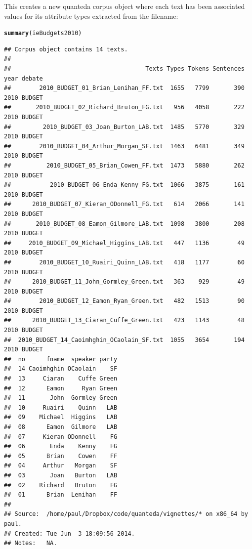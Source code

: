 \documentclass[11pt]{article}\usepackage[]{graphicx}\usepackage[]{color}
\makeatletter
\newcommand{\hlstd}[1]{\textcolor[rgb]{0.345,0.345,0.345}{#1}}%
\newcommand{\hlkwd}[1]{\textcolor[rgb]{0.737,0.353,0.396}{\textbf{#1}}}%
\newenvironment{kframe}{%
 \def\at@end@of@kframe{}%
 \ifinner\ifhmode%
  \def\at@end@of@kframe{\end{minipage}}%
  \begin{minipage}{\columnwidth}%
 \fi\fi%
 \def\FrameCommand##1{\hskip\@totalleftmargin \hskip-\fboxsep
 \colorbox{shadecolor}{##1}\hskip-\fboxsep
     \hskip-\linewidth \hskip-\@totalleftmargin \hskip\columnwidth}%
 \MakeFramed {\advance\hsize-\width
   \@totalleftmargin\z@ \linewidth\hsize
   \@setminipage}}%
 {\par\unskip\endMakeFramed%
 \at@end@of@kframe}
\newenvironment{knitrout}{}{} %
\makeatother
\begin{document}
This creates a new quanteda corpus object where each text has been associated values for its attribute types extracted from the filename:

\begin{knitrout}
\color{fgcolor}\begin{kframe}
\begin{alltt}
\hlkwd{summary}\hlstd{(ieBudgets2010)}
\end{alltt}
\begin{verbatim}
## Corpus object contains 14 texts.
## 
##                                      Texts Types Tokens Sentences year debate
##        2010_BUDGET_01_Brian_Lenihan_FF.txt  1655   7799       390 2010 BUDGET
##       2010_BUDGET_02_Richard_Bruton_FG.txt   956   4058       222 2010 BUDGET
##         2010_BUDGET_03_Joan_Burton_LAB.txt  1485   5770       329 2010 BUDGET
##        2010_BUDGET_04_Arthur_Morgan_SF.txt  1463   6481       349 2010 BUDGET
##          2010_BUDGET_05_Brian_Cowen_FF.txt  1473   5880       262 2010 BUDGET
##           2010_BUDGET_06_Enda_Kenny_FG.txt  1066   3875       161 2010 BUDGET
##      2010_BUDGET_07_Kieran_ODonnell_FG.txt   614   2066       141 2010 BUDGET
##       2010_BUDGET_08_Eamon_Gilmore_LAB.txt  1098   3800       208 2010 BUDGET
##     2010_BUDGET_09_Michael_Higgins_LAB.txt   447   1136        49 2010 BUDGET
##        2010_BUDGET_10_Ruairi_Quinn_LAB.txt   418   1177        60 2010 BUDGET
##      2010_BUDGET_11_John_Gormley_Green.txt   363    929        49 2010 BUDGET
##        2010_BUDGET_12_Eamon_Ryan_Green.txt   482   1513        90 2010 BUDGET
##      2010_BUDGET_13_Ciaran_Cuffe_Green.txt   423   1143        48 2010 BUDGET
##  2010_BUDGET_14_Caoimhghin_OCaolain_SF.txt  1055   3654       194 2010 BUDGET
##  no      fname  speaker party
##  14 Caoimhghin OCaolain    SF
##  13     Ciaran    Cuffe Green
##  12      Eamon     Ryan Green
##  11       John  Gormley Green
##  10     Ruairi    Quinn   LAB
##  09    Michael  Higgins   LAB
##  08      Eamon  Gilmore   LAB
##  07     Kieran ODonnell    FG
##  06       Enda    Kenny    FG
##  05      Brian    Cowen    FF
##  04     Arthur   Morgan    SF
##  03       Joan   Burton   LAB
##  02    Richard   Bruton    FG
##  01      Brian  Lenihan    FF
## 
## Source:  /home/paul/Dropbox/code/quanteda/vignettes/* on x86_64 by paul.
## Created: Tue Jun  3 18:09:56 2014.
## Notes:   NA.
\end{verbatim}
\end{kframe}
\end{knitrout}
\end{document}
